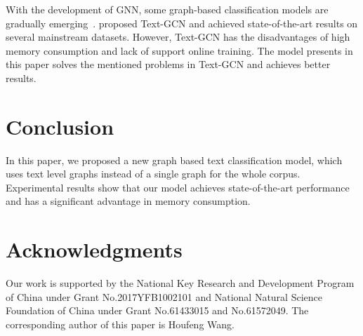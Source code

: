 \documentclass[11pt,a4paper]{article}
\begin{document}
With the development of GNN, some graph-based classification models are gradually emerging~\cite{hamilton2017inductive, velivckovic2017graph, peng2018large}.  proposed Text-GCN and achieved state-of-the-art results on several mainstream datasets. However, Text-GCN has the disadvantages of high memory consumption and lack of support online training. The model presents in this paper solves the mentioned problems in Text-GCN and achieves better results.

\section{Conclusion}
In this paper, we proposed a new graph based text classification model, which uses text level graphs instead of a single graph for the whole corpus. Experimental results show that our model achieves state-of-the-art performance and has a significant advantage in memory consumption. 

\section*{Acknowledgments}

Our work is supported by the National Key Research and Development Program of China under Grant No.2017YFB1002101 and National Natural Science Foundation of China under Grant No.61433015 and No.61572049. The corresponding author of this paper is Houfeng Wang. \\





\appendix
\end{document}
